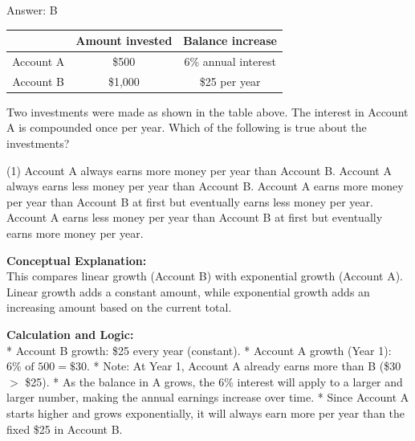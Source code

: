 \documentclass[11pt,paper=a4,answers]{exam}
\begin{document}
\begin{questions}
\begin{solution}
\vspace{30pt}

Answer: \colorbox{yellow!100}{B}
\end{solution}

\vspace{60pt}

\question
\begin{center}
\begin{tabular}{|c|c|c|}
\hline
 & Amount invested & Balance increase \\ \hline
Account A & \$500 & 6\% annual interest \\ \hline
Account B & \$1,000 & \$25 per year \\ \hline
\end{tabular}
\end{center}
Two investments were made as shown in the table above. The interest in Account A is compounded once per year. Which of the following is true about the investments?
\begin{tasks}(1)
    \task Account A always earns more money per year than Account B.
    \task Account A always earns less money per year than Account B.
    \task Account A earns more money per year than Account B at first but eventually earns less money per year.
    \task Account A earns less money per year than Account B at first but eventually earns more money per year.
\end{tasks}

\begin{solution}
\textbf{Conceptual Explanation:} \\
This compares linear growth (Account B) with exponential growth (Account A). Linear growth adds a constant amount, while exponential growth adds an increasing amount based on the current total.

\vspace{30pt}

\textbf{Calculation and Logic:} \\
* Account B growth: \$25 every year (constant).
* Account A growth (Year 1): $6\% \text{ of } 500 = \$30$.
* Note: At Year 1, Account A already earns more than B (\$30 $>$ \$25). 
* As the balance in A grows, the 6\% interest will apply to a larger and larger number, making the annual earnings increase over time.
* Since Account A starts higher and grows exponentially, it will always earn more per year than the fixed \$25 in Account B.

\vspace{30pt}


\end{solution}
\end{questions}
\end{document}
